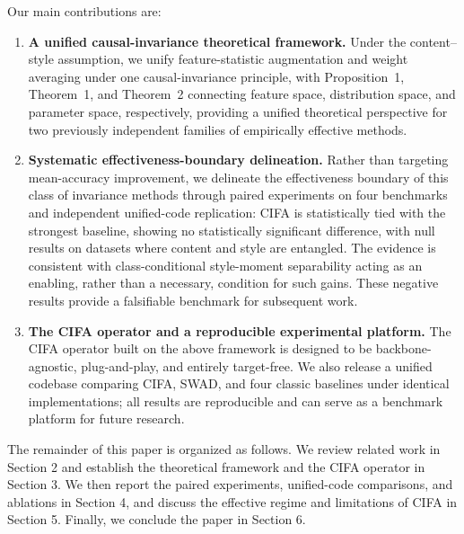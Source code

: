 \documentclass[electronics,article,submit,moreauthors]{Definitions/mdpi}
\newcommand{\add}[1]{\textcolor{addblue}{#1}}
\newcommand{\del}[1]{\textcolor{delred}{\st{#1}}}
\def\add#1{#1}%
\def\del#1{}%
\renewcommand{\add}[1]{#1}
\renewcommand{\del}[1]{}
\begin{document}
Our main contributions are:
\begin{enumerate}
\item \textbf{A unified causal-invariance theoretical framework.} Under the content--style assumption, we unify feature-statistic augmentation and weight averaging under one causal-invariance principle, with Proposition~1, Theorem~1, and Theorem~2 connecting feature space, distribution space, and parameter space, respectively, providing a unified theoretical perspective for two previously independent families of empirically effective methods.
\item \textbf{Systematic effectiveness-boundary delineation.} Rather than targeting mean-accuracy improvement, we delineate the \add{effectiveness }boundary of this class of invariance methods through paired experiments on four benchmarks and independent unified-code replication: CIFA is statistically tied with the strongest baseline, showing no statistically significant difference, with null results on datasets where content and style are entangled. \del{Component ablations further demonstrate that class-conditional style-moment separability is a necessary rather than sufficient condition.}\add{The evidence is consistent with class-conditional style-moment separability acting as an enabling, rather than a necessary, condition for such gains.} These negative results provide a falsifiable benchmark for subsequent work.
\item \textbf{The CIFA operator and a reproducible experimental platform.} The CIFA operator built on the above framework is \add{designed to be }backbone-agnostic, plug-and-play, and entirely target-free. We also release a unified codebase comparing CIFA, SWAD, and four classic baselines under identical implementations; all results are reproducible and can serve as a benchmark platform for future research.
\end{enumerate}

The remainder of this paper is organized as follows. \del{Section~2 establishes the theoretical framework of CIFA; Section~3 verifies its accuracy equivalence, worst-domain tendency, and component contributions through paired experiments on four DomainBed benchmarks; Section~4 discusses the effective regime and limitations of CIFA; Section~5 concludes the paper.}\add{We review related work in Section 2 and establish the theoretical framework and the CIFA operator in Section 3. We then report the paired experiments, unified-code comparisons, and ablations in Section 4, and discuss the effective regime and limitations of CIFA in Section 5. Finally, we conclude the paper in Section 6.}
\end{document}
